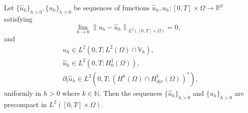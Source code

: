 \documentclass[10pt,a4paper]{amsart}
\newcommand\norm[1]{\left\lVert#1\right\rVert}
\newcommand{\Div}{\operatorname{div}}
\newcommand{\N}{\mathbb{N}}
\newcommand{\R}{\mathbb{R}}
\newcommand{\Vh}{\mathbb{V}_h}
\newcommand{\dom}{\Omega}
\newcommand{\hu}{\widehat{u}}
\begin{document}
\begin{lemma}
	\label{lem:aubinlionsmodified}
	Let  $\{\hu_h\}_{h>0}, \{u_h\}_{h>0}$ be  sequences of functions $\hu_h,u_h: [0,T]\times\dom\to \R^d$ satisfying
	\begin{equation}\label{eq:samelimit}
		\lim_{h\to 0}\norm{ u_h-\hu_h}_{L^2([0,T]\times \dom)}=0,	
		\end{equation}
	and
	\begin{equation}
		\label{eq:aprioriAL}\begin{split}
			& u_h\in L^2(0,T;L^2(\dom)\cap \Vh),\\
			&\hu_h\in  L^2(0,T;H^1_0(\dom)),\\
			&\partial_t \hu_h\in L^2(0,T;(H^k(\dom)\cap H^1_{\Div}(\dom))^*),	
		\end{split}
	\end{equation}
	uniformly in $h>0$ where $k\in \N$. Then the sequences $\{\hu_h\}_{h>0}$ and $\{u_h\}_{h>0}$ are precompact in $L^2([0,T]\times\dom)$.
\end{lemma}
\end{document}
